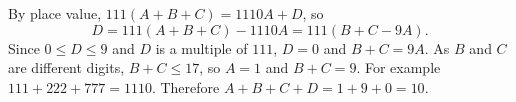 By place value, $111(A+B+C)=1110A+D$, so
\[D=111(A+B+C)-1110A=111(B+C-9A).\]
Since $0\le D\le9$ and $D$ is a multiple of $111$, $D=0$ and $B+C=9A$. As $B$ and $C$ are different digits, $B+C\le17$, so $A=1$ and $B+C=9$. For example $111+222+777=1110$. Therefore $A+B+C+D=1+9+0=\boxed{10}$.
